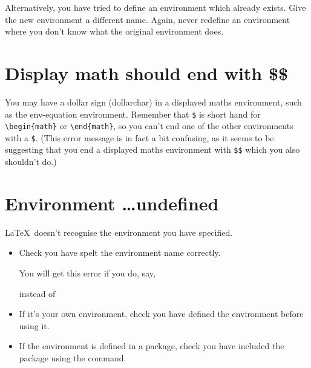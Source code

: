 Alternatively, you have tried to define an
\gls{environment} which already exists.  Give the new
environment a different name.  Again, never redefine an environment
where you don't know what the original environment does.


\section{Display math should end with \$\$}

You may have a dollar sign (\gls{dollarchar}) in a displayed maths
environment, such as the \gls{env-equation} environment.  
Remember that \verb|$| is short hand for \verb|\begin{math}| or 
\verb|\end{math}|, so you can't end one of the other environments 
with a \verb|$|. (This error message is in fact a bit confusing,
as it seems to be suggesting that you end a displayed maths
environment with \verb|$$| which you also shouldn't do.)


\section{Environment \texorpdfstring{\protect\ldots}{...}\protect\space undefined}

\LaTeX\ doesn't recognise the environment you have specified.

\begin{itemize}
\item Check you have spelt the environment name correctly.

You will get this error if you do, say,
\begin{alltt}\wrong
{}
\end{alltt}
instead of
\begin{alltt}\correct
{}
\end{alltt}

\item If it's your own environment, check you have defined the
environment before using it.

\item If the environment is defined in a package, check you 
have included the package using the 
 command.

\end{itemize}

